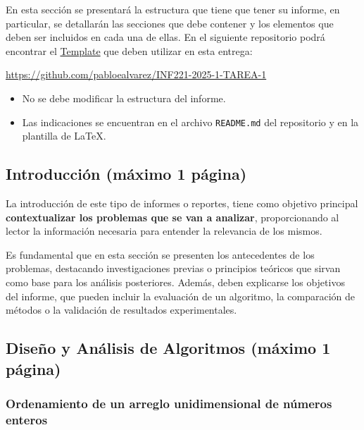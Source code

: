 En esta sección se presentará la estructura que tiene que tener su informe, en particular, se detallarán las secciones que debe contener y los elementos que deben ser incluidos en cada una de ellas. En el siguiente repositorio podrá encontrar el \href{https://github.com/pabloealvarez/INF221-2025-1-TAREA-1}{Template} que deben utilizar en esta entrega:

\begin{mdframed}

    \begin{center}
    {\Large
    \url{https://github.com/pabloealvarez/INF221-2025-1-TAREA-1}
    }    
\end{center}
\end{mdframed}

\begin{itemize}
    \item No se debe modificar la estructura del informe.
    \item Las indicaciones se encuentran en el archivo \texttt{README.md} del repositorio y en la plantilla de \LaTeX. 
\end{itemize}

\subsection{Introducción (máximo 1 página)}

La introducción de este tipo de informes o reportes, tiene como objetivo principal \textbf{contextualizar los problemas que se van a analizar}, proporcionando al lector la información necesaria para entender la relevancia de los mismos. 

Es fundamental que en esta sección se presenten los antecedentes de los problemas, destacando investigaciones previas o principios teóricos que sirvan como base para los análisis posteriores. Además, deben explicarse los objetivos del informe, que pueden incluir la evaluación de un algoritmo, la comparación de métodos o la validación de resultados experimentales.

\subsection{Diseño y Análisis de Algoritmos (máximo 1 página)}



\subsubsection{Ordenamiento de un arreglo unidimensional de números enteros}

